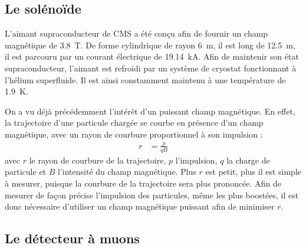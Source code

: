 

\subsection{Le solénoïde}

L'aimant supraconducteur de CMS a été conçu afin de fournir un champ magnétique de \SI{3.8}{\tesla}. De forme cylindrique de rayon \SI{6}{\m}, il est long de \SI{12.5}{\meter}, il est parcouru par un courant électrique de \SI{19.14}{\kilo\ampere}. Afin de maintenir son état supraconducteur, l'aimant est refroidi par un système de cryostat fonctionnant à l'hélium superfluide. Il est ainsi constamment maintenu à une température de \SI{1.9}{\kelvin}.

On a vu déjà précédemment l'intérêt d'un puissant champ magnétique. En effet, la trajectoire d'une particule chargée se courbe en présence d'un champ magnétique, avec un rayon de courbure proportionnel à son impulsion :
\begin{align*}
  r &= \frac{p}{qB}
\end{align*}
avec $r$ le rayon de courbure de la trajectoire, $p$ l'impulsion, $q$ la charge de particule et $B$ l'intensité du champ magnétique. Plus $r$ est petit, plus il est simple à mesurer, puisque la courbure de la trajectoire sera plus prononcée. Afin de mesurer de façon précise l'impulsion des particules, même les plus boostées, il est donc nécessaire d'utiliser un champ magnétique puissant afin de minimiser $r$.

\subsection{Le détecteur à muons}

